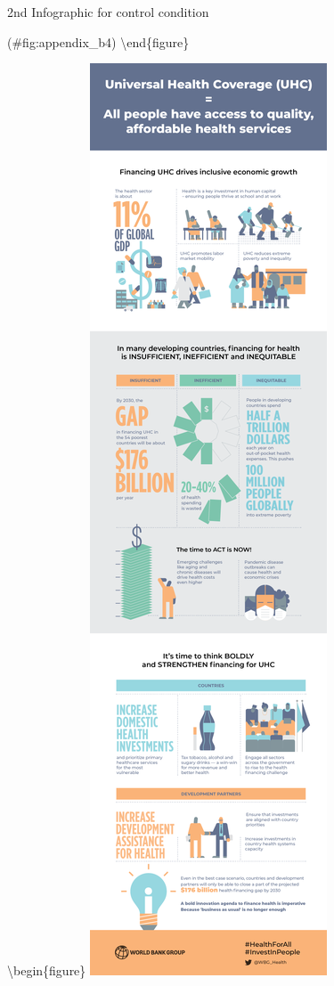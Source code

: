 \documentclass[
  english,
  man]{apa6}
\begin{document}
\caption{2nd Infographic for control condition}

(\#fig:appendix\_b4)
\textbackslash end\{figure\}

\textbackslash begin\{figure\}
\includegraphics[width=1\linewidth]{appendix_b_5}
\end{document}
